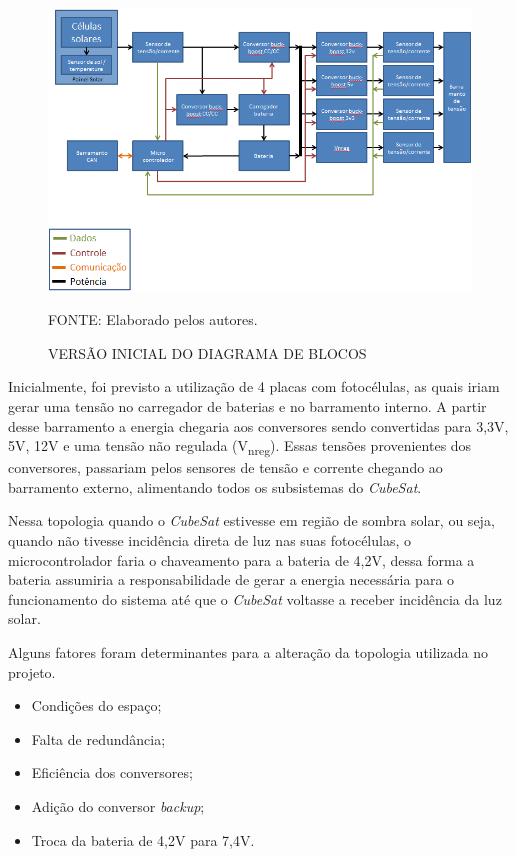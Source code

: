 \documentclass[
	12pt,				%
	openright,			%
	oneside,			%
	a4paper,			%
	english,			%
	french,				%
	spanish,			%
	brazil,				%
	oldfontcommands
	]{abntex2}
\begin{document}
	\begin{figure}[th]
		\caption{VERSÃO INICIAL DO DIAGRAMA DE BLOCOS}
		\label{Fig_Diag_Blocos_Inicial}
		\centering
		\includegraphics[width=1.0\linewidth]{./figs/diag_blocos_inicial}
			
		\begin{small}
			FONTE: Elaborado pelos autores.
		\end{small}		
	\end{figure}	
	\pagebreak

	Inicialmente, foi previsto a utilização de 4 placas com fotocélulas, as quais iriam gerar uma tensão no carregador de baterias e no barramento interno. A partir desse barramento a energia chegaria aos conversores sendo convertidas para 3,3V, 5V, 12V e uma tensão não regulada (V\textsubscript{nreg}). Essas tensões provenientes dos conversores, passariam pelos sensores de tensão e corrente chegando ao barramento externo, alimentando todos os subsistemas do \textit{CubeSat}.
	
	Nessa topologia quando o \textit{CubeSat} estivesse em região de sombra solar, ou seja, quando não tivesse incidência direta de luz nas suas fotocélulas, o microcontrolador faria o chaveamento para a bateria de 4,2V, dessa forma a bateria assumiria a responsabilidade de gerar a energia necessária para o funcionamento do sistema até que o \textit{CubeSat} voltasse a receber incidência da luz solar.
	
	Alguns fatores foram determinantes para a alteração da topologia utilizada no projeto.
	
	\begin{minipage}{7cm}	
		\begin{itemize}
			\item	Condições do espaço;
			\item	Falta de redundância;
			\item	Eficiência dos conversores;
		\end{itemize}
	\end{minipage}
	\begin{minipage}{7cm}
		\begin{itemize}
			\item	Adição do conversor \textit{backup};
			\item	Troca da bateria de 4,2V para 7,4V.
		\end{itemize}
	\end{minipage}
	\pagebreak
	
\end{document}

